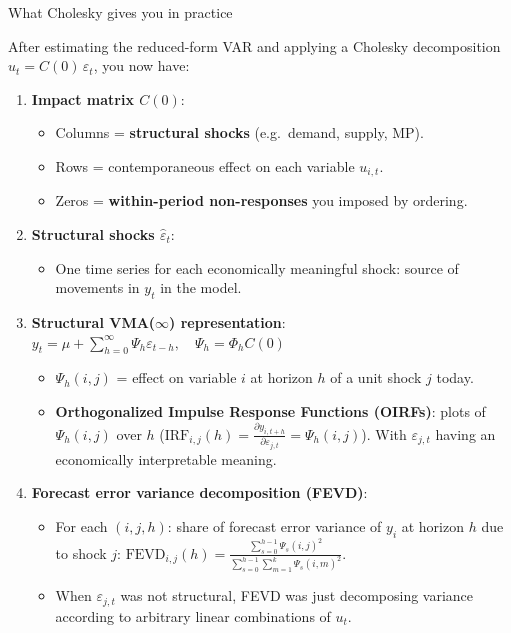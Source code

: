 \documentclass{beamer}
\begin{document}
\begin{frame}{What Cholesky gives you in practice}
\scriptsize

After estimating the reduced-form VAR and applying a Cholesky decomposition $u_t = C(0)\,\varepsilon_t$, you now have:

\medskip
\begin{enumerate}
  \item \textbf{Impact matrix $C(0)$}:
  \begin{itemize}
  \scriptsize
    \item Columns = \textbf{structural shocks} (e.g.\ demand, supply, MP).
    \item Rows = contemporaneous effect on each variable $u_{i,t}$.
    \item Zeros = \textbf{within-period non-responses} you imposed by ordering.
  \end{itemize}

  \medskip
  \item \textbf{Structural shocks $\widehat{\varepsilon}_t$}:
  \begin{itemize}
  \scriptsize
    \item One time series for each economically meaningful shock: source of movements in $y_t$ in the model.
  \end{itemize}

  \medskip
  \item \textbf{Structural VMA($\infty$) representation}: $  y_t = \mu + \sum_{h=0}^{\infty} \Psi_h \varepsilon_{t-h},
  \quad 
  \Psi_h = \Phi_h C(0)$
  \begin{itemize}
  \scriptsize
    \item $\Psi_h(i,j)$ = effect on variable $i$ at horizon $h$ of a unit shock $j$ today.
    \item \textbf{Orthogonalized Impulse Response Functions (OIRFs)}: plots of $\Psi_h(i,j)$ over $h$ ($\text{IRF}_{i,j}(h) = \frac{\partial y_{i,t+h}}{\partial \varepsilon_{j,t}}
= \Psi_h(i,j)$). With $\varepsilon_{j,t}$ having an economically interpretable meaning.
  \end{itemize}

  \medskip
  \item \textbf{Forecast error variance decomposition (FEVD)}:
  \begin{itemize}
  \scriptsize
    \item For each $(i,j,h)$: share of forecast error variance of $y_i$ at horizon $h$
          due to shock $j$: $\text{FEVD}_{i,j}(h)
    = \frac{\sum_{s=0}^{h-1} \Psi_s(i,j)^2}
           { \sum_{s=0}^{h-1} \sum_{m=1}^k \Psi_s(i,m)^2}$.
           \item   When $\varepsilon_{j,t}$ was not structural, FEVD was just decomposing variance according to arbitrary linear combinations of $u_t$. 
           \end{itemize}
\end{enumerate}
\end{frame}
\end{document}
